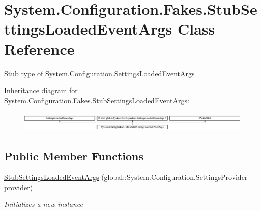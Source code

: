 \hypertarget{class_system_1_1_configuration_1_1_fakes_1_1_stub_settings_loaded_event_args}{\section{System.\-Configuration.\-Fakes.\-Stub\-Settings\-Loaded\-Event\-Args Class Reference}
\label{class_system_1_1_configuration_1_1_fakes_1_1_stub_settings_loaded_event_args}
}


Stub type of System.\-Configuration.\-Settings\-Loaded\-Event\-Args 


Inheritance diagram for System.\-Configuration.\-Fakes.\-Stub\-Settings\-Loaded\-Event\-Args\-:\begin{figure}[H]
\begin{center}
\leavevmode
\includegraphics[height=0.985048cm]{class_system_1_1_configuration_1_1_fakes_1_1_stub_settings_loaded_event_args}
\end{center}
\end{figure}
\subsection*{Public Member Functions}
\begin{DoxyCompactItemize}
\item 
\hyperlink{class_system_1_1_configuration_1_1_fakes_1_1_stub_settings_loaded_event_args_ad10461fdfb11fa04a6b0c6adcb87772e}{Stub\-Settings\-Loaded\-Event\-Args} (global\-::\-System.\-Configuration.\-Settings\-Provider provider)
\begin{DoxyCompactList}\small\item\em Initializes a new instance\end{DoxyCompactList}\end{DoxyCompactItemize}
